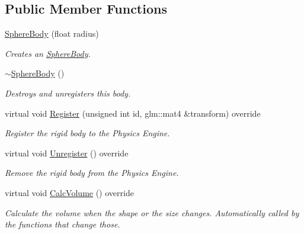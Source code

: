 \subsection*{Public Member Functions}
\begin{DoxyCompactItemize}
\item 
\hyperlink{classTarbora_1_1SphereBody_a35e582dfbc4660cb796360ceec62e168}{Sphere\+Body} (float radius)
\begin{DoxyCompactList}\small\item\em Creates an \hyperlink{classTarbora_1_1SphereBody}{Sphere\+Body}. \end{DoxyCompactList}\item 
\mbox{\label{classTarbora_1_1SphereBody_a4592aa7dad4a13f33839f4883f21654b}} 
\hyperlink{classTarbora_1_1SphereBody_a4592aa7dad4a13f33839f4883f21654b}{$\sim$\+Sphere\+Body} ()
\begin{DoxyCompactList}\small\item\em Destroys and unregisters this body. \end{DoxyCompactList}\item 
virtual void \hyperlink{classTarbora_1_1SphereBody_aa4c177c62075afa568b73ec019201dd7}{Register} (unsigned int id, glm\+::mat4 \&transform) override
\begin{DoxyCompactList}\small\item\em Register the rigid body to the Physics Engine. \end{DoxyCompactList}\item 
\mbox{\label{classTarbora_1_1SphereBody_abb1c800fda3cfab36f60a64fb8c77cae}} 
virtual void \hyperlink{classTarbora_1_1SphereBody_abb1c800fda3cfab36f60a64fb8c77cae}{Unregister} () override
\begin{DoxyCompactList}\small\item\em Remove the rigid body from the Physics Engine. \end{DoxyCompactList}\item 
\mbox{\label{classTarbora_1_1SphereBody_a6421e1677d335d10f3f49c68f71613ab}} 
virtual void \hyperlink{classTarbora_1_1SphereBody_a6421e1677d335d10f3f49c68f71613ab}{Calc\+Volume} () override
\begin{DoxyCompactList}\small\item\em Calculate the volume when the shape or the size changes. Automatically called by the functions that change those. \end{DoxyCompactList}\item 

\end{DoxyCompactItemize}
